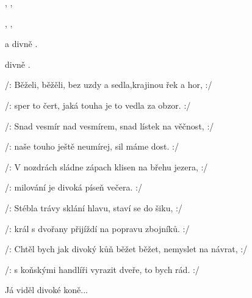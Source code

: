 

\zs
{}  ,  
, 

  ,  
, 

   a divně  
. 

   divně  
.  \ks

\zs
/: Běželi, běžěli, bez uzdy a sedla,krajinou řek a hor, :/

/: sper to čert, jaká touha je to vedla za obzor. :/
\ks

\zs
/: Snad vesmír nad vesmírem, snad lístek na věčnost, :/

/: naše touho ještě neumírej, sil máme dost. :/
\ks

\zs
/: V nozdrách sládne zápach klisen na břehu jezera, :/

/: milování je divoká píseň večera. :/
\ks

\zs
/: Stébla trávy sklání hlavu, staví se do šiku, :/

/: král s dvořany přijíždí na popravu zbojníků. :/
\ks

\zs
/: Chtěl bych jak divoký kůň běžet běžet, nemyslet na návrat, :/

/: s koňskými handlíři vyrazit dveře, to bych rád. :/
\ks



Já viděl divoké koně...  \kp

